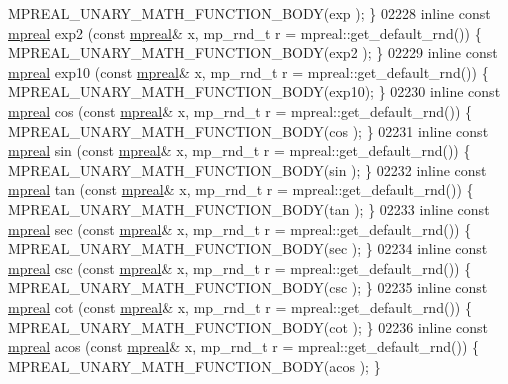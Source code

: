\begin{DoxyCode}
{{      MPREAL\_UNARY\_MATH\_FUNCTION\_BODY(exp  );    \}
02228 \textcolor{keyword}{inline} \textcolor{keyword}{const} \hyperlink{classmpfr_1_1mpreal}{mpreal} exp2  (\textcolor{keyword}{const} \hyperlink{classmpfr_1_1mpreal}{mpreal}& x, mp\_rnd\_t r = mpreal::get\_default\_rnd()) \{   
      MPREAL\_UNARY\_MATH\_FUNCTION\_BODY(exp2 );    \}
02229 \textcolor{keyword}{inline} \textcolor{keyword}{const} \hyperlink{classmpfr_1_1mpreal}{mpreal} exp10 (\textcolor{keyword}{const} \hyperlink{classmpfr_1_1mpreal}{mpreal}& x, mp\_rnd\_t r = mpreal::get\_default\_rnd()) \{   
      MPREAL\_UNARY\_MATH\_FUNCTION\_BODY(exp10);    \}
02230 \textcolor{keyword}{inline} \textcolor{keyword}{const} \hyperlink{classmpfr_1_1mpreal}{mpreal} cos   (\textcolor{keyword}{const} \hyperlink{classmpfr_1_1mpreal}{mpreal}& x, mp\_rnd\_t r = mpreal::get\_default\_rnd()) \{   
      MPREAL\_UNARY\_MATH\_FUNCTION\_BODY(cos  );    \}
02231 \textcolor{keyword}{inline} \textcolor{keyword}{const} \hyperlink{classmpfr_1_1mpreal}{mpreal} sin   (\textcolor{keyword}{const} \hyperlink{classmpfr_1_1mpreal}{mpreal}& x, mp\_rnd\_t r = mpreal::get\_default\_rnd()) \{   
      MPREAL\_UNARY\_MATH\_FUNCTION\_BODY(sin  );    \}
02232 \textcolor{keyword}{inline} \textcolor{keyword}{const} \hyperlink{classmpfr_1_1mpreal}{mpreal} tan   (\textcolor{keyword}{const} \hyperlink{classmpfr_1_1mpreal}{mpreal}& x, mp\_rnd\_t r = mpreal::get\_default\_rnd()) \{   
      MPREAL\_UNARY\_MATH\_FUNCTION\_BODY(tan  );    \}
02233 \textcolor{keyword}{inline} \textcolor{keyword}{const} \hyperlink{classmpfr_1_1mpreal}{mpreal} sec   (\textcolor{keyword}{const} \hyperlink{classmpfr_1_1mpreal}{mpreal}& x, mp\_rnd\_t r = mpreal::get\_default\_rnd()) \{   
      MPREAL\_UNARY\_MATH\_FUNCTION\_BODY(sec  );    \}
02234 \textcolor{keyword}{inline} \textcolor{keyword}{const} \hyperlink{classmpfr_1_1mpreal}{mpreal} csc   (\textcolor{keyword}{const} \hyperlink{classmpfr_1_1mpreal}{mpreal}& x, mp\_rnd\_t r = mpreal::get\_default\_rnd()) \{   
      MPREAL\_UNARY\_MATH\_FUNCTION\_BODY(csc  );    \}
02235 \textcolor{keyword}{inline} \textcolor{keyword}{const} \hyperlink{classmpfr_1_1mpreal}{mpreal} cot   (\textcolor{keyword}{const} \hyperlink{classmpfr_1_1mpreal}{mpreal}& x, mp\_rnd\_t r = mpreal::get\_default\_rnd()) \{   
      MPREAL\_UNARY\_MATH\_FUNCTION\_BODY(cot  );    \}
02236 \textcolor{keyword}{inline} \textcolor{keyword}{const} \hyperlink{classmpfr_1_1mpreal}{mpreal} acos  (\textcolor{keyword}{const} \hyperlink{classmpfr_1_1mpreal}{mpreal}& x, mp\_rnd\_t r = mpreal::get\_default\_rnd()) \{   
      MPREAL\_UNARY\_MATH\_FUNCTION\_BODY(acos );    \}
}}
\end{DoxyCode}
